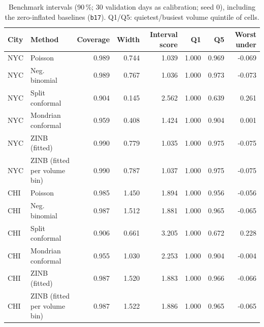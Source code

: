 \documentclass[11pt]{article}
\begin{document}
\begin{table}[H]\centering\scriptsize\setlength{\tabcolsep}{3pt}
\caption{Benchmark intervals (90\,\%; 30 validation days as calibration; seed 0), including the zero-inflated baselines (\texttt{b17}). Q1/Q5: quietest/busiest volume quintile of cells.}\label{tab:s5}
\begin{tabularx}{\linewidth}{llrrrrrr}\toprule
City & Method & Coverage & Width & Interval score & Q1 & Q5 & Worst under\\\midrule
NYC & Poisson & 0.989 & 0.744 & 1.039 & 1.000 & 0.969 & -0.069 \\
NYC & Neg. binomial & 0.989 & 0.767 & 1.036 & 1.000 & 0.973 & -0.073 \\
NYC & Split conformal & 0.904 & 0.145 & 2.562 & 1.000 & 0.639 & 0.261 \\
NYC & Mondrian conformal & 0.959 & 0.408 & 1.424 & 1.000 & 0.904 & 0.001 \\
NYC & ZINB (fitted) & 0.990 & 0.779 & 1.035 & 1.000 & 0.975 & -0.075 \\
NYC & ZINB (fitted per volume bin) & 0.990 & 0.787 & 1.037 & 1.000 & 0.975 & -0.075 \\
CHI & Poisson & 0.985 & 1.450 & 1.894 & 1.000 & 0.956 & -0.056 \\
CHI & Neg. binomial & 0.987 & 1.512 & 1.881 & 1.000 & 0.965 & -0.065 \\
CHI & Split conformal & 0.906 & 0.661 & 3.205 & 1.000 & 0.672 & 0.228 \\
CHI & Mondrian conformal & 0.955 & 1.030 & 2.253 & 1.000 & 0.904 & -0.004 \\
CHI & ZINB (fitted) & 0.987 & 1.520 & 1.883 & 1.000 & 0.966 & -0.066 \\
CHI & ZINB (fitted per volume bin) & 0.987 & 1.522 & 1.886 & 1.000 & 0.965 & -0.065 \\
\bottomrule\end{tabularx}\end{table}
\end{document}
